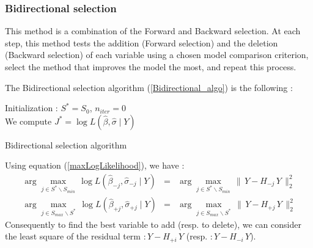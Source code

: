 \newpage
\subsubsection{Bidirectional selection}

This method is a combination of the Forward and Backward selection. At each step, this method tests
the addition (Forward selection) and the deletion (Backward selection) of each variable using a chosen model comparison criterion,
select the method that improves the model the most, and repeat this process.

The Bidirectional selection algorithm (\ref{Bidirectional_algo}) is the following :
\begin{algorithm}
\label{Bidirectional_algo}
Initialization : $S^* = S_0$, $n_{iter} = 0 $\\
We compute $J^* = \log L(\hat{\beta},\hat{\sigma}\mid Y)$  \\
\caption{Bidirectional selection algorithm }
\end{algorithm}

Using equation (\ref{maxLogLikelihood}), we have :
 \begin{eqnarray}
 \arg   \displaystyle\max_{j \in S^*\backslash S_{min}}\,  \log L(\hat{\beta}_{-j},\hat{\sigma}_{-j}\mid Y) &=&
\arg \displaystyle\max_{j \in S^*\backslash S_{min}}\, \|\,Y-H_{-j}\,Y\,\|^2_2  \\
\arg   \displaystyle\max_{j \in S_{max} \backslash S^*}\,  \log L(\hat{\beta}_{+j},\hat{\sigma}_{+j}\mid Y)  &=&
\arg \displaystyle\max_{j \in S_{max} \backslash S^*}\, \|\,Y-H_{+j}\,Y\,\|^2_2
 \end{eqnarray}
 Consequently to find the best variable to add (resp. to delete), we can consider the least square of the residual term $:Y-H_{+i}\,Y$
 (resp.  $:Y-H_{-i}\,Y$).

